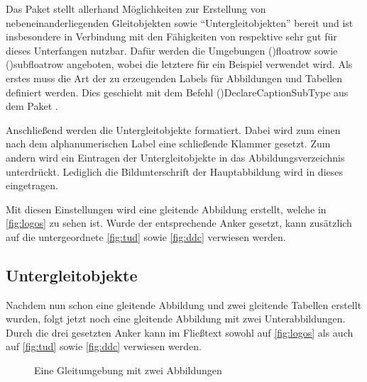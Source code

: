\documentclass[%
  english,ngerman,%
  cdgeometry=no,DIV=12,%
  cd=false,cdfont=false,cdtitle=true,%
  headings=normal,%
  automark,%
  listof=toc,%
]{tudscrartcl}
\begin{document}
Das Paket  stellt allerhand Möglichkeiten zur Erstellung von 
nebeneinanderliegenden Gleitobjekten sowie \enquote{Untergleitobjekten} bereit 
und ist insbesondere in Verbindung mit den Fähigkeiten von  
respektive  sehr gut für dieses Unterfangen nutzbar. Dafür 
werden die Umgebungen \Environment(){floatrow} sowie 
\Environment(){subfloatrow} angeboten, wobei die letztere für 
ein Beispiel verwendet wird. Als erstes muss die Art der zu erzeugenden Labels 
für Abbildungen und Tabellen definiert werden. Dies geschieht mit dem Befehl 
\Macro(){DeclareCaptionSubType} aus dem Paket 
.
%
\begin{Preamble}
\end{Preamble}
%
Anschließend werden die Untergleitobjekte formatiert. Dabei wird zum einen nach 
dem alphanumerischen Label eine schließende Klammer gesetzt. Zum andern wird 
ein Eintragen der Untergleitobjekte in das Abbildungsverzeichnis unterdrückt. 
Lediglich die Bildunterschrift der Hauptabbildung wird in dieses eingetragen.
%
\begin{Preamble*}
\captionsetup[subfloat]{labelformat=brace,list=off}

\end{Preamble*}
%
Mit diesen Einstellungen wird eine gleitende Abbildung erstellt, welche in 
\autoref{fig:logos} zu sehen ist. Wurde der entsprechende Anker gesetzt, kann 
zusätzlich auf die untergeordnete \autoref{fig:tud} sowie \autoref{fig:ddc} 
verwiesen werden.
%
\begin{Trunk+}
\subsection{Untergleitobjekte}

Nachdem nun schon eine gleitende Abbildung und zwei gleitende Tabellen 
erstellt wurden, folgt jetzt noch eine gleitende Abbildung mit zwei 
Unterabbildungen. Durch die drei gesetzten Anker kann im Fließtext 
sowohl auf \autoref{fig:logos} als auch auf \autoref{fig:tud} sowie 
\autoref{fig:ddc} verwiesen werden.

\end{Trunk+}
\begin{Trunk}
\begin{figure}
%
  {\caption{Eine Gleitumgebung mit zwei Abbildungen\label{fig:logos}}}%
\end{figure}

\end{Trunk}
\InputCode
\end{document}
